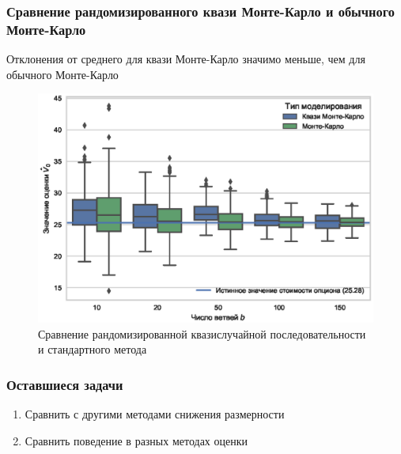 \documentclass[unicode, notheorems]{beamer}
\begin{document}
	\begin{frame}
	\frametitle{Сравнение рандомизированного квази Монте-Карло и обычного Монте-Карло} 
	Отклонения от среднего для квази Монте-Карло значимо меньше, чем для обычного Монте-Карло
	\begin{figure}[h]
	    \centering
		\includegraphics[height=0.65\paperheight]{quasi_vs_common_mc.eps}
		\caption{Сравнение рандомизированной квазислучайной последовательности и стандартного метода}
		\label{fig:quasi_vs_common_mc}
	\end{figure}
	\end{frame}

	\begin{frame}
	\frametitle{Оставшиеся задачи} 
	\begin{enumerate}
		\item Сравнить с другими методами снижения размерности
		\item Сравнить поведение в разных методах оценки
	\end{enumerate}
	\end{frame}
\end{document}
